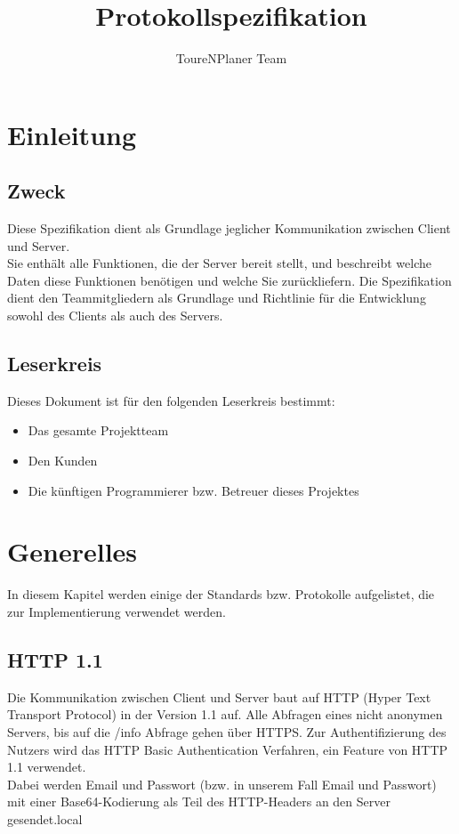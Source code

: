 \documentclass[ngerman,titlepage,parskip=true]{scrartcl}
\title{Protokollspezifikation}
\author{ToureNPlaner Team}
\begin{document}
\maketitle

\tableofcontents

\pagebreak

\section{Einleitung}

	\subsection{Zweck}
	
	Diese Spezifikation dient als Grundlage jeglicher Kommunikation zwischen Client und Server.\\
	Sie enthält alle Funktionen, die der Server bereit stellt, und beschreibt welche Daten diese Funktionen benötigen und welche Sie zurückliefern. 
	Die Spezifikation dient den Teammitgliedern als Grundlage und Richtlinie für die Entwicklung sowohl des Clients als auch des Servers.
	
	\subsection{Leserkreis}
	
	Dieses Dokument ist für den folgenden Leserkreis bestimmt:
	
	\begin{itemize}
		\item Das gesamte Projektteam
		\item Den Kunden
		\item Die künftigen Programmierer bzw. Betreuer dieses Projektes
	\end{itemize}
	
\section{Generelles}

	In diesem Kapitel werden einige der Standards bzw. Protokolle aufgelistet, die zur Implementierung verwendet werden.

	\subsection{HTTP 1.1}

	Die Kommunikation zwischen Client und Server baut auf HTTP (Hyper Text Transport Protocol) in der Version 1.1 auf. Alle Abfragen eines nicht anonymen Servers, bis auf die /info Abfrage gehen über HTTPS.
	Zur Authentifizierung des Nutzers wird das HTTP Basic Authentication Verfahren, ein Feature von HTTP 1.1 verwendet.\\
	Dabei werden Email und Passwort (bzw. in unserem Fall Email und Passwort) mit einer Base64-Kodierung als Teil des HTTP-Headers an den Server gesendet.local
	
\end{document}
